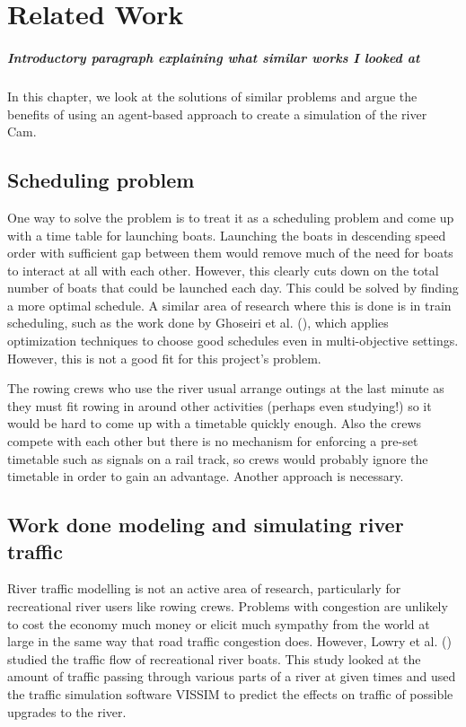 \chapter{Related Work}\label{chapter:background}
  \paragraph{Introductory paragraph explaining what similar works I looked at}
  In this chapter, we look at the solutions of similar problems and argue the benefits of using an agent-based approach to create a simulation of the river Cam.

  \section{Scheduling problem}
    One way to solve the problem is to treat it as a scheduling problem and come up with a time table for launching boats. Launching the boats in descending speed order with sufficient gap between them would remove much of the need for boats to interact at all with each other. However, this clearly cuts down on the total number of boats that could be launched each day. This could be solved by finding a more optimal schedule. A similar area of research where this is done is in train scheduling, such as the work done by Ghoseiri et al. (\cite{Ghoseiri2004}), which applies optimization techniques to choose good schedules even in multi-objective settings. However, this is not a good fit for this project's problem. 
    
    The rowing crews who use the river usual arrange outings at the last minute as they must fit rowing in around other activities (perhaps even studying!) so it would be hard to come up with a timetable quickly enough. Also the crews compete with each other but there is no mechanism for enforcing a pre-set timetable such as signals on a rail track, so crews would probably ignore the timetable in order to gain an advantage. Another approach is necessary.

  \section{Work done modeling and simulating river traffic}
  River traffic modelling is not an active area of research, particularly for recreational river users like rowing crews. Problems with congestion are unlikely to cost the economy much money or elicit much sympathy from the world at large in the same way that road traffic congestion does. However, Lowry et al. (\cite{Lowry2011})  studied the traffic flow of recreational river boats. This study looked at the amount of traffic passing through various parts of a river at given times and used the traffic simulation software VISSIM to predict the effects on traffic of possible upgrades to the river. 
  
